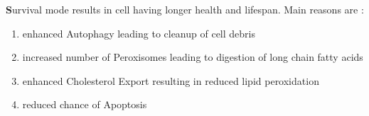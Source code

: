 \textbf Survival mode results in cell having longer health and lifespan. Main reasons are :
\begin{enumerate}
\item enhanced Autophagy leading to cleanup of cell debris
\item increased number of Peroxisomes leading to digestion of long chain fatty acids
\item enhanced Cholesterol Export resulting in reduced lipid peroxidation
\item reduced chance of Apoptosis
\end{enumerate}